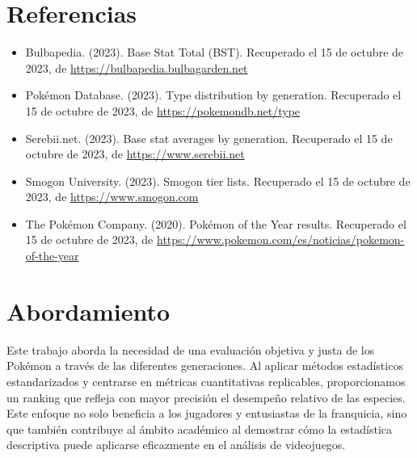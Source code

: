 \documentclass[
]{article}
\providecommand{\tightlist}{%
  \setlength{\itemsep}{0pt}\setlength{\parskip}{0pt}}
\begin{document}
\section{Referencias}\label{referencias}

\begin{itemize}
\tightlist
\item
  Bulbapedia. (2023). Base Stat Total (BST). Recuperado el 15 de octubre
  de 2023, de
  \href{https://bulbapedia.bulbagarden.net/}{https://bulbapedia.bulbagarden.net}
\item
  Pokémon Database. (2023). Type distribution by generation. Recuperado
  el 15 de octubre de 2023, de \url{https://pokemondb.net/type}
\item
  Serebii.net. (2023). Base stat averages by generation. Recuperado el
  15 de octubre de 2023, de
  \href{https://www.serebii.net/}{https://www.serebii.net}
\item
  Smogon University. (2023). Smogon tier lists. Recuperado el 15 de
  octubre de 2023, de
  \href{https://www.smogon.com/}{https://www.smogon.com}
\item
  The Pokémon Company. (2020). Pokémon of the Year results. Recuperado
  el 15 de octubre de 2023, de
  \url{https://www.pokemon.com/es/noticias/pokemon-of-the-year}
\end{itemize}

\section{Abordamiento}\label{abordamiento}

Este trabajo aborda la necesidad de una evaluación objetiva y justa de
los Pokémon a través de las diferentes generaciones. Al aplicar métodos
estadísticos estandarizados y centrarse en métricas cuantitativas
replicables, proporcionamos un ranking que refleja con mayor precisión
el desempeño relativo de las especies. Este enfoque no solo beneficia a
los jugadores y entusiastas de la franquicia, sino que también
contribuye al ámbito académico al demostrar cómo la estadística
descriptiva puede aplicarse eficazmente en el análisis de videojuegos.
\end{document}
